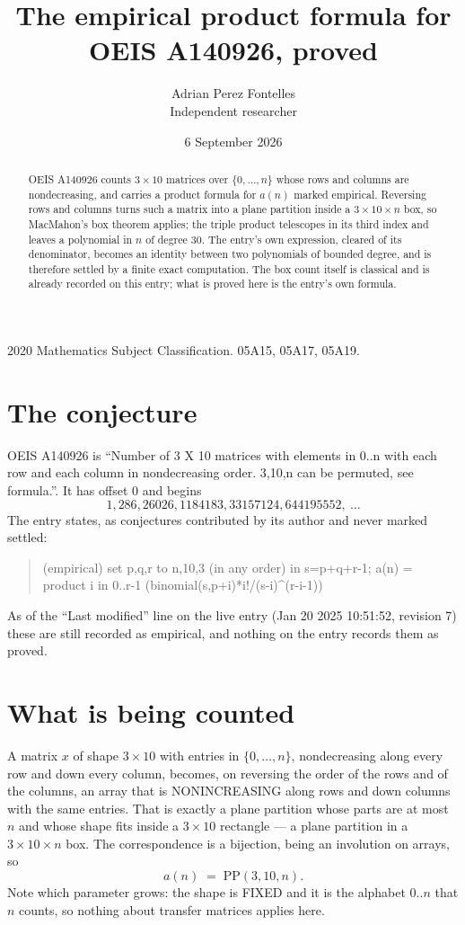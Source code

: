 \documentclass[11pt,a4paper]{article}
\title{The empirical product formula for OEIS A140926, proved}
\author{Adrian Perez Fontelles\\ \small Independent researcher}
\date{6 September 2026}
\theoremstyle{plain}
\theoremstyle{definition}
\begin{document}
\maketitle

\begin{abstract}
OEIS A140926 counts $3\times10$ matrices over $\{0,\dots,n\}$ whose rows and columns are
nondecreasing, and carries a product formula for $a(n)$ marked empirical. Reversing rows and
columns turns such a matrix into a plane partition inside a $3\times10\times n$ box, so
MacMahon's box theorem applies; the triple product telescopes in its third index and leaves a
polynomial in $n$ of degree $30$. The entry's own expression, cleared of its denominator,
becomes an identity between two polynomials of bounded degree, and is therefore settled by a
finite exact computation. The box count itself is classical and is already recorded on this
entry; what is proved here is the entry's own formula.
\end{abstract}

\noindent\small 2020 Mathematics Subject Classification. 05A15, 05A17, 05A19.\normalsize

\section{The conjecture}

OEIS A140926 is ``Number of 3 X 10 matrices with elements in 0..n with each row and each column in nondecreasing order. 3,10,n can be permuted, see formula.''. It has offset $0$ and begins
\[
1, 286, 26026, 1184183, 33157124, 644195552,\ \dots
\]
The entry states, as conjectures contributed by its author and never marked settled:
\begin{quote}
(empirical) set p,q,r to n,10,3 (in any order) in s=p+q+r-1; a(n) = product {i in 0..r-1} (binomial(s,p+i)*i!/(s-i)\^{}(r-i-1))

\end{quote}
As of the ``Last modified'' line on the live entry (Jan 20 2025 10:51:52, revision 7) these are still
recorded as empirical, and nothing on the entry records them as proved.

\section{What is being counted}

A matrix $x$ of shape $3\times10$ with entries in $\{0,\dots,n\}$, nondecreasing along
every row and down every column, becomes, on reversing the order of the rows and of the
columns, an array that is NONINCREASING along rows and down columns with the same entries. That
is exactly a plane partition whose parts are at most $n$ and whose shape fits inside a
$3\times10$ rectangle --- a plane partition in a $3\times10\times n$ box. The
correspondence is a bijection, being an involution on arrays, so
\[
a(n)\;=\;\mathrm{PP}(3,10,n).
\]
Note which parameter grows: the shape is FIXED and it is the alphabet $0..n$ that $n$ counts,
so nothing about transfer matrices applies here.
\end{document}
